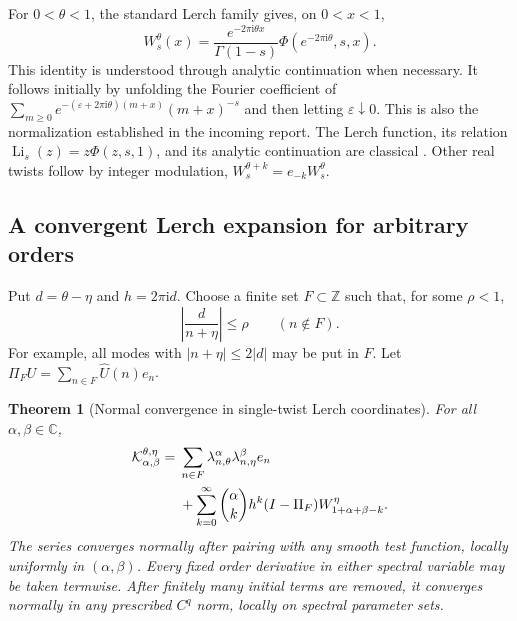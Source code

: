 \documentclass[11pt,a4paper]{article}
\numberwithin{equation}{section}
\newtheorem{theorem}{Theorem}[section]
\theoremstyle{definition}
\theoremstyle{remark}
\DeclareMathOperator{\Li}{Li}
\newcommand{\Z}{\mathbb Z}
\newcommand{\C}{\mathbb C}
\newcommand{\ii}{\mathrm i}
\begin{document}
For $0<\theta<1$, the standard Lerch family gives, on $0<x<1$,
\begin{equation}
 W_s^\theta(x)=\frac{e^{-2\pi\ii\theta x}}{\Gamma(1-s)}
       \Phi(e^{-2\pi\ii\theta},s,x).
 \label{tw:lerch}
\end{equation}
This identity is understood through analytic continuation when necessary.
It follows initially by unfolding the Fourier coefficient of
$\sum_{m\ge0}e^{-(\varepsilon+2\pi\ii\theta)(m+x)}(m+x)^{-s}$
and then letting $\varepsilon\downarrow0$. This is also the
normalization established in the incoming report. The Lerch function,
its relation $\Li_s(z)=z\Phi(z,s,1)$, and its analytic continuation
are classical \cite{DLMFLerch}. Other real twists follow by integer
modulation, $W_s^{\theta+k}=e_{-k}W_s^\theta$.

\subsection{A convergent Lerch expansion for arbitrary orders}

Put $d=\theta-\eta$ and $h=2\pi\ii d$. Choose a finite set
$F\subset\Z$ such that, for some $\rho<1$,
\begin{equation}
 \left|\frac{d}{n+\eta}\right|\le\rho\qquad(n\notin F).
 \label{tw:Fcondition}
\end{equation}
For example, all modes with $|n+\eta|\le2|d|$ may be put in $F$.
Let $\Pi_FU=\sum_{n\in F}\widehat U(n)e_n$.

\begin{theorem}[Normal convergence in single-twist Lerch coordinates]
\label{tw:tailtheorem}
For all $\alpha,\beta\in\C$,
\begin{align}
 \mathcal K_{\alpha,\beta}^{\theta,\eta}
 ={}&\sum_{n\in F}
        \lambda_{n,\theta}^{\alpha}\lambda_{n,\eta}^{\beta}e_n
       \notag\\
 &+\sum_{k=0}^{\infty}\binom\alpha k h^k
       (I-\Pi_F)W_{1+\alpha+\beta-k}^{\eta}.
 \label{tw:tailseries}
\end{align}
The series converges normally after pairing with any smooth test
function, locally uniformly in $(\alpha,\beta)$. Every fixed order
derivative in either spectral variable may be taken termwise. After
finitely many initial terms are removed, it converges normally in any
prescribed $C^q$ norm, locally on spectral parameter sets.
\end{theorem}
\end{document}
